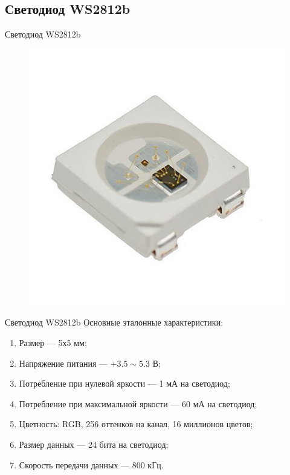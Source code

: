 
\subsection{Светодиод WS2812b}

\begin{frame}{Светодиод WS2812b}
  \begin{figure}
    \centering
    \includegraphics[height=0.75\textheight]{assets/images/ws2812__general.jpg}
  \end{figure}
\end{frame}

\begin{frame}{Светодиод WS2812b}
  Основные эталонные характеристики:
  \begin{enumerate}
    \item Размер --- 5х5 мм;
    \item Напряжение питания --- $+3.5 \sim 5.3$ В;
    \item Потребление при нулевой яркости --- 1 мА на светодиод;
    \item Потребление при максимальной яркости --- 60 мА на светодиод;
    \item Цветность: RGB, 256 оттенков на канал, 16 миллионов цветов;
    \item Размер данных --- 24 бита на светодиод;
    \item Скорость передачи данных --- 800 кГц.
  \end{enumerate}
\end{frame}


